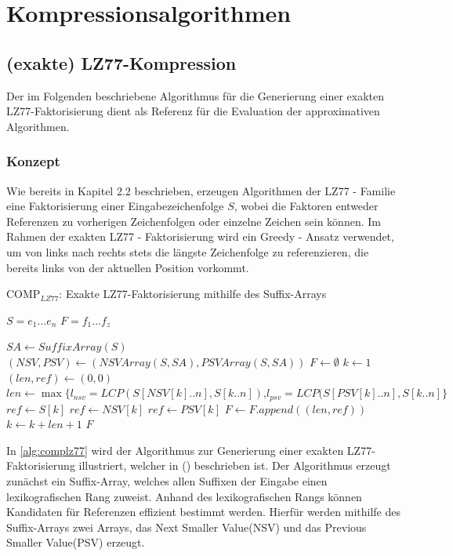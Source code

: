\chapter{Kompressionsalgorithmen}

\section{(exakte) LZ77-Kompression}
Der im Folgenden beschriebene Algorithmus für die Generierung einer exakten LZ77-Faktorisierung dient als Referenz für die Evaluation der approximativen Algorithmen.

\subsection{Konzept}
Wie bereits in Kapitel 2.2 beschrieben, erzeugen Algorithmen der LZ77 - Familie eine Faktorisierung einer Eingabezeichenfolge $S$, wobei die Faktoren entweder Referenzen
zu vorherigen Zeichenfolgen oder einzelne Zeichen sein können. Im Rahmen der exakten LZ77 - Faktorisierung wird ein Greedy - Ansatz verwendet, um von links nach rechts 
stets die längste Zeichenfolge zu referenzieren, die bereits links von der aktuellen Position vorkommt.
\begin{algorithm}[ht]
\centering
\caption{COMP$_{LZ77}$: Exakte LZ77-Faktorisierung mithilfe des Suffix-Arrays} \label{alg:complz77}
\algorithmicrequire $S=e_1...e_n$
\algorithmicensure $F=f_1...f_z$
\begin{algorithmic} [1]
    \STATE $SA \gets SuffixArray(S)$
    \STATE $(NSV, PSV) \gets (NSVArray(S, SA), PSVArray(S, SA))$
    \STATE $F \gets \emptyset$
    \STATE $k \gets 1$
    \STATE $(len, ref) \gets (0, 0)$
    \STATE $len \gets \max\{l_{nsv}=LCP(S[NSV[k]..n], S[k..n])\text{,} l_{psv}=LCP(S[PSV[k]..n], S[k..n]\}$
        \STATE $ref \gets S[k]$
        \STATE $ref \gets NSV[k]$
    \ELSE
        \STATE $ref \gets PSV[k]$
    \ENDIF
    \STATE $F \gets F.append((len, ref))$
    \STATE $k \gets k + len + 1$
    \ENDWHILE
    \RETURN $F$
\end{algorithmic}
\end{algorithm}
In \ref{alg:complz77} wird der Algorithmus zur Generierung einer exakten LZ77-Faktorisierung illustriert, welcher in (\cite{exactLemZiv}) beschrieben ist. Der 
Algorithmus erzeugt zunächst ein Suffix-Array, welches allen Suffixen der Eingabe einen lexikografischen Rang zuweist. Anhand des lexikografischen Rangs 
können Kandidaten für Referenzen effizient bestimmt werden. Hierfür werden mithilfe des Suffix-Arrays zwei Arrays, das Next Smaller Value(NSV) und das 
Previous Smaller Value(PSV) erzeugt.

